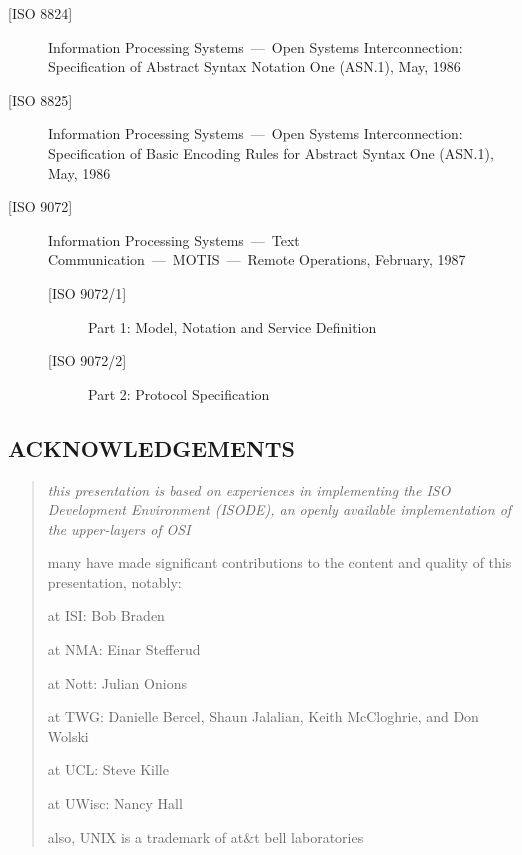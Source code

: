 \begin{bwslide}

\begin{description}
\item[{[ISO 8824]}]	Information Processing Systems~---~Open Systems
			Interconnection: Specification of Abstract Syntax
			Notation One (ASN.1), May, 1986

\item[{[ISO 8825]}]	Information Processing Systems~---~Open Systems
			Interconnection: Specification of Basic Encoding
			Rules for Abstract Syntax One (ASN.1), May, 1986

\item[{[ISO 9072]}]	Information Processing Systems~---~Text
			Communication~---~MOTIS~---~Remote Operations,
			February, 1987
    \begin{description}
    \item[{[ISO 9072/1]}]	Part 1: Model, Notation and Service
				Definition

    \item[{[ISO 9072/2]}]	Part 2: Protocol Specification
    \end{description}
\end{description}
\end{bwslide}


\begin{bwslide}
\part*	{ACKNOWLEDGEMENTS}\bf

\begin{quote}\em
this presentation is based on experiences in implementing the ISO
Development Environment (ISODE),
an openly available implementation of the upper-layers of OSI

many have made significant contributions to the content and quality of
this presentation, notably:
\begin{nrtc}
\item	at ISI: Bob Braden

\item	at NMA: Einar Stefferud

\item	at Nott: Julian Onions

\item	at TWG: Danielle Bercel, Shaun Jalalian, Keith McCloghrie,
	and Don Wolski 

\item	at UCL: Steve Kille

\item	at UWisc: Nancy Hall
\end{nrtc}

also, UNIX is a trademark of at\&t bell laboratories
\end{quote}
\end{bwslide}



